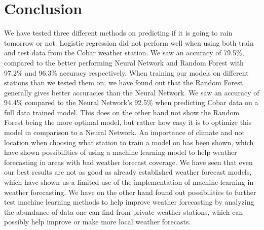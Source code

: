 \documentclass[11pt]{article}
\begin{document}
\section{Conclusion}
\label{sec:Conclusion}
We have tested three different methods on predicting if it is going to rain tomorrow or not. Logistic regression did not perform well when using both train and test data from the Cobar weather station. We saw an accuracy of 79.5\%, compared to the better performing Neural Network and Random Forest with 97.2\% and 96.3\% accuracy respectively. When training our models on different stations than we tested them on, we have found out that the Random Forest generally gives better accuracies than the Neural Network. We saw an accuracy of 94.4\% compared to the Neural Network's 92.5\% when predicting Cobar data on a full data trained model. This does on the other hand not show the Random Forest being the more optimal model, but rather how easy it is to optimize this model in comparison to a Neural Network. An importance of climate and not location when choosing what station to train a model on has been shown, which have shown possibilities of using a machine learning model to help weather forecasting in areas with bad weather forecast coverage. We have seen that even our best results are not as good as already established weather forecast models, which have shown us a limited use of the implementation of machine learning in weather forecasting. We have on the other hand found out possibilities to further test machine learning methods to help improve weather forecasting by analyzing the abundance of data one can find from private weather stations, which can possibly help improve or make more local weather forecasts.
\newpage

\printbibliography
\newpage
\appendix
\end{document}
